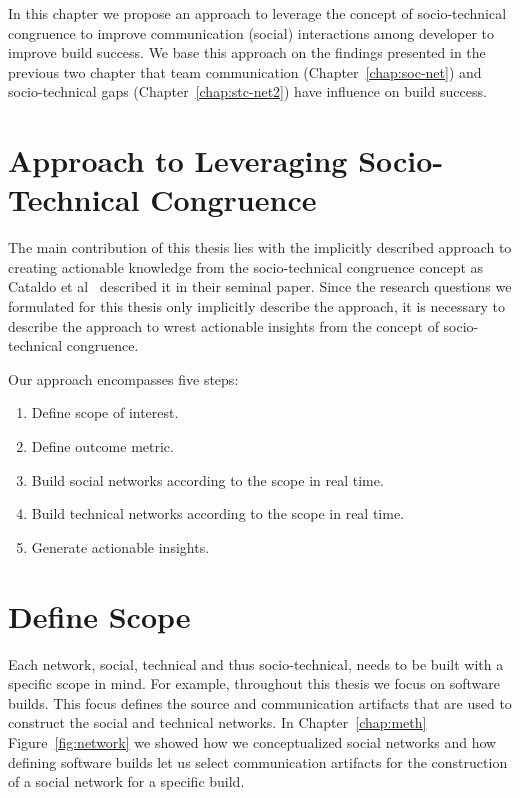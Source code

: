 \label{chap:approach}
In this chapter we propose an approach to leverage the concept of socio-technical congruence to improve communication (social) interactions among developer to improve build success.
We base this approach on the findings presented in the previous two chapter that team communication (Chapter~\ref{chap:soc-net}) and socio-technical gaps (Chapter~\ref{chap:stc-net2}) have influence on build success.

\section{Approach to Leveraging Socio-Technical Congruence}
The main contribution of this thesis lies with the implicitly described approach to creating actionable knowledge from the socio-technical congruence concept as Cataldo et al~\cite{cataldo:cscw:2006} described it in their seminal paper.
Since the research questions we formulated for this thesis only implicitly describe the approach, it is necessary to describe the approach to wrest actionable insights from the concept of socio-technical congruence.

Our approach encompasses five steps:
\begin{enumerate}
\item Define scope of interest.
\item Define outcome metric.
\item Build social networks according to the scope in real time.
\item Build technical networks according to the scope in real time.
\item Generate actionable insights.
\end{enumerate}

\section{Define Scope} 
Each network, social, technical and thus socio-technical, needs to be built with a specific scope in mind.
For example, throughout this thesis we focus on software builds.
This focus defines the source and communication artifacts that are used to construct the social and technical networks.
In Chapter~\ref{chap:meth} Figure~\ref{fig:network} we showed how we conceptualized social networks and how defining software builds let us select communication artifacts for the construction of a social network for a specific build.

